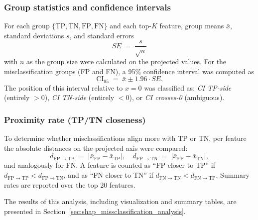 
\subsubsection{Group statistics and confidence intervals}

For each group $\{\mathrm{TP}, \mathrm{TN}, \mathrm{FP}, \mathrm{FN}\}$ and each top-$K$ feature, group means $\bar{x}$, standard deviations $s$, and standard errors
\[
SE \;=\; \frac{s}{\sqrt{n}}
\]
with $n$ as the group size were calculated on the projected values. For the misclassification groups (FP and FN), a 95\% confidence interval was computed as
\[
\mathrm{CI}_{95} \;=\; \bar{x} \pm 1.96 \cdot SE.
\]
The position of this interval relative to $x=0$ was classified as:
\emph{CI TP-side} (entirely $>0$), \emph{CI TN-side} (entirely $<0$), or \emph{CI crosses-0} (ambiguous).

\subsubsection{Proximity rate (TP/TN closeness)}

To determine whether misclassifications align more with TP or TN, per feature the absolute distances on the projected axis were compared:
\[
d_{\mathrm{FP}\to\mathrm{TP}} \;=\; \bigl|\bar{x}_{\mathrm{FP}} - \bar{x}_{\mathrm{TP}}\bigr|,\quad
d_{\mathrm{FP}\to\mathrm{TN}} \;=\; \bigl|\bar{x}_{\mathrm{FP}} - \bar{x}_{\mathrm{TN}}\bigr|,
\]
and analogously for FN. A feature is counted as “FP closer to TP” if $d_{\mathrm{FP}\to\mathrm{TP}} < d_{\mathrm{FP}\to\mathrm{TN}}$, and as “FN closer to TN” if $d_{\mathrm{FN}\to\mathrm{TN}} < d_{\mathrm{FN}\to\mathrm{TP}}$. Summary rates are reported over the top 20 features. 

The results of this analysis, including visualization and summary tables, are presented in Section~\ref{sec:shap_missclassification_analysis}.


